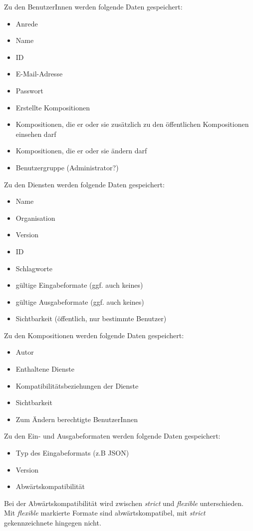 Zu den BenutzerInnen werden folgende Daten gespeichert:
\begin{itemize}
	\item Anrede
	\item Name
	\item ID
	\item E-Mail-Adresse
	\item Passwort
	\item Erstellte Kompositionen
	\item Kompositionen, die er oder sie zusätzlich zu den öffentlichen Kompositionen einsehen darf
	\item Kompositionen, die er oder sie ändern darf
	\item Benutzergruppe (Administrator?)
\end{itemize}
Zu den Diensten werden folgende Daten gespeichert:
\begin{itemize}
	\item Name
	\item Organisation
	\item Version
	\item ID
	\item Schlagworte
	\item gültige Eingabeformate (ggf. auch keines)
	\item gültige Ausgabeformate (ggf. auch keines)
	\item Sichtbarkeit (öffentlich, nur bestimmte Benutzer)
\end{itemize}
Zu den Kompositionen werden folgende Daten gespeichert:
\begin{itemize}
	\item Autor
	\item Enthaltene Dienste
	\item Kompatibilitätsbeziehungen der Dienste
	\item Sichtbarkeit
	\item Zum Ändern berechtigte BenutzerInnen
\end{itemize}

Zu den Ein- und Ausgabeformaten werden folgende Daten gespeichert:
\begin{itemize}
	\item Typ des Eingabeformats (z.B JSON)
	\item Version
	\item Abwärtskompatibilität
\end{itemize}
Bei der Abwärtskompatibilität wird zwischen \textit{strict} und \textit{flexible} unterschieden. Mit \textit{flexible} markierte Formate sind abwärtskompatibel, mit \textit{strict} gekennzeichnete hingegen nicht.
